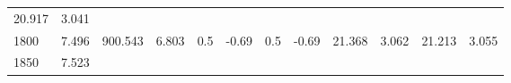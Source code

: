 \documentclass{article}
\begin{document}
\begin{longtable}[]{@{}llllllllllll@{}}
\begin{minipage}[t]{0.06\columnwidth}
20.917\strut
\end{minipage} & \begin{minipage}[t]{0.09\columnwidth}\raggedright\strut
3.041\strut
\end{minipage}\tabularnewline
\begin{minipage}[t]{0.03\columnwidth}\raggedright\strut
1800\strut
\end{minipage} & \begin{minipage}[t]{0.06\columnwidth}\raggedright\strut
7.496\strut
\end{minipage} & \begin{minipage}[t]{0.06\columnwidth}\raggedright\strut
900.543\strut
\end{minipage} & \begin{minipage}[t]{0.08\columnwidth}\raggedright\strut
6.803\strut
\end{minipage} & \begin{minipage}[t]{0.03\columnwidth}\raggedright\strut
0.5\strut
\end{minipage} & \begin{minipage}[t]{0.06\columnwidth}\raggedright\strut
-0.69\strut
\end{minipage} & \begin{minipage}[t]{0.03\columnwidth}\raggedright\strut
0.5\strut
\end{minipage} & \begin{minipage}[t]{0.06\columnwidth}\raggedright\strut
-0.69\strut
\end{minipage} & \begin{minipage}[t]{0.06\columnwidth}\raggedright\strut
21.368\strut
\end{minipage} & \begin{minipage}[t]{0.08\columnwidth}\raggedright\strut
3.062\strut
\end{minipage} & \begin{minipage}[t]{0.06\columnwidth}\raggedright\strut
21.213\strut
\end{minipage} & \begin{minipage}[t]{0.09\columnwidth}\raggedright\strut
3.055\strut
\end{minipage}\tabularnewline
\begin{minipage}[t]{0.03\columnwidth}\raggedright\strut
1850\strut
\end{minipage} & \begin{minipage}[t]{0.06\columnwidth}\raggedright\strut
7.523\strut
\end{minipage} & \begin{minipage}[t]{0.06\columnwidth}\raggedright\strut

\end{minipage}
\end{longtable}
\end{document}
